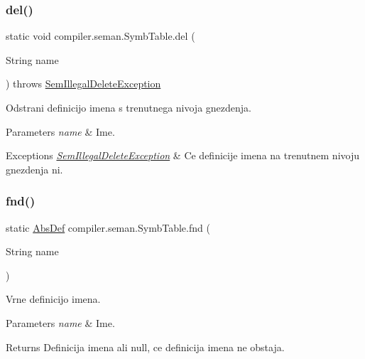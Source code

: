 \subsubsection{\texorpdfstring{del()}{del()}}
{\footnotesize\ttfamily static void compiler.\+seman.\+Symb\+Table.\+del (\begin{DoxyParamCaption}\item[{String}]{name }\end{DoxyParamCaption}) throws \hyperlink{classcompiler_1_1seman_1_1_sem_illegal_delete_exception}{Sem\+Illegal\+Delete\+Exception}\hspace{0.3cm}{\ttfamily [static]}}

Odstrani definicijo imena s trenutnega nivoja gnezdenja.


\begin{DoxyParams}{Parameters}
{\em name} & Ime. \\
\hline
\end{DoxyParams}

\begin{DoxyExceptions}{Exceptions}
{\em \hyperlink{classcompiler_1_1seman_1_1_sem_illegal_delete_exception}{Sem\+Illegal\+Delete\+Exception}} & Ce definicije imena na trenutnem nivoju gnezdenja ni. \\
\hline
\end{DoxyExceptions}
\mbox{\label{classcompiler_1_1seman_1_1_symb_table_a638dde2019f3bbe8e31976ca0650bef6}} 
\subsubsection{\texorpdfstring{fnd()}{fnd()}}
{\footnotesize\ttfamily static \hyperlink{classcompiler_1_1abstr_1_1tree_1_1def_1_1_abs_def}{Abs\+Def} compiler.\+seman.\+Symb\+Table.\+fnd (\begin{DoxyParamCaption}\item[{String}]{name }\end{DoxyParamCaption})\hspace{0.3cm}{\ttfamily [static]}}

Vrne definicijo imena.


\begin{DoxyParams}{Parameters}
{\em name} & Ime. \\
\hline
\end{DoxyParams}
\begin{DoxyReturn}{Returns}
Definicija imena ali null, ce definicija imena ne obstaja. 
\end{DoxyReturn}
\mbox{\label{classcompiler_1_1seman_1_1_symb_table_a6c65cc874971dc94ce10c401c86afbc5}} 
